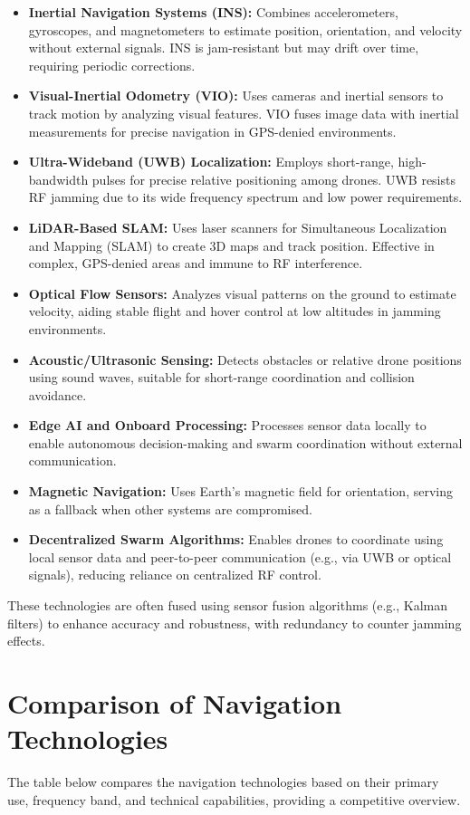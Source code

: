 \documentclass[12pt]{article}
\begin{document}
\begin{itemize}[label=$\bullet$]
    \item \textbf{Inertial Navigation Systems (INS):} Combines accelerometers, gyroscopes, and magnetometers to estimate position, orientation, and velocity without external signals. INS is jam-resistant but may drift over time, requiring periodic corrections.
    \item \textbf{Visual-Inertial Odometry (VIO):} Uses cameras and inertial sensors to track motion by analyzing visual features. VIO fuses image data with inertial measurements for precise navigation in GPS-denied environments.
    \item \textbf{Ultra-Wideband (UWB) Localization:} Employs short-range, high-bandwidth pulses for precise relative positioning among drones. UWB resists RF jamming due to its wide frequency spectrum and low power requirements.
    \item \textbf{LiDAR-Based SLAM:} Uses laser scanners for Simultaneous Localization and Mapping (SLAM) to create 3D maps and track position. Effective in complex, GPS-denied areas and immune to RF interference.
    \item \textbf{Optical Flow Sensors:} Analyzes visual patterns on the ground to estimate velocity, aiding stable flight and hover control at low altitudes in jamming environments.
    \item \textbf{Acoustic/Ultrasonic Sensing:} Detects obstacles or relative drone positions using sound waves, suitable for short-range coordination and collision avoidance.
    \item \textbf{Edge AI and Onboard Processing:} Processes sensor data locally to enable autonomous decision-making and swarm coordination without external communication.
    \item \textbf{Magnetic Navigation:} Uses Earth's magnetic field for orientation, serving as a fallback when other systems are compromised.
    \item \textbf{Decentralized Swarm Algorithms:} Enables drones to coordinate using local sensor data and peer-to-peer communication (e.g., via UWB or optical signals), reducing reliance on centralized RF control.
\end{itemize}

These technologies are often fused using sensor fusion algorithms (e.g., Kalman filters) to enhance accuracy and robustness, with redundancy to counter jamming effects.

\section{Comparison of Navigation Technologies}
The table below compares the navigation technologies based on their primary use, frequency band, and technical capabilities, providing a competitive overview.
\end{document}
